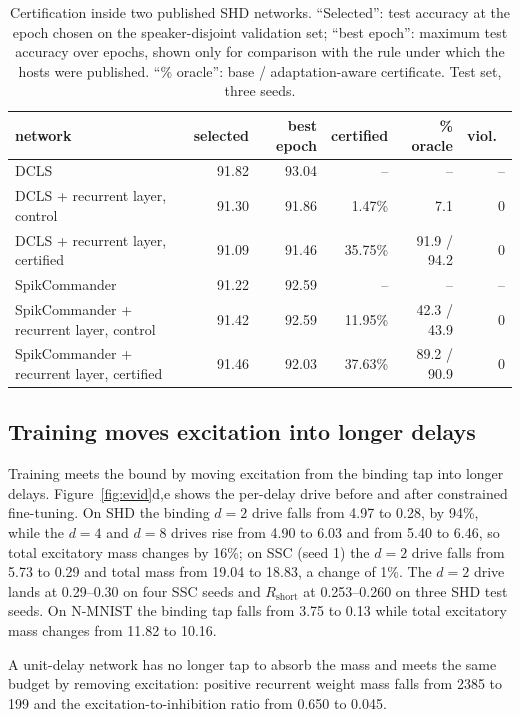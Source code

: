 \documentclass{iopjournal}
\begin{document}
\begin{table}
\caption{\label{tab:sota}Certification inside two published SHD networks. ``Selected'': test accuracy at the epoch chosen on the speaker-disjoint validation set; ``best epoch'': maximum test accuracy over epochs, shown only for comparison with the rule under which the hosts were published. ``\% oracle'': base / adaptation-aware certificate. Test set, three seeds.}
\centering
\begin{tabular}{lrrrrr}
\hline
network & selected & best epoch & certified & \% oracle & viol.\ \\
\hline
DCLS \cite{dcls}                           & 91.82 & 93.04 & --      & --          & -- \\
DCLS + recurrent layer, control            & 91.30 & 91.86 & 1.47\%  & 7.1         & 0 \\
DCLS + recurrent layer, certified          & 91.09 & 91.46 & 35.75\% & 91.9 / 94.2 & 0 \\
\hline
SpikCommander \cite{spikcommander}         & 91.22 & 92.59 & --      & --          & -- \\
SpikCommander + recurrent layer, control   & 91.42 & 92.59 & 11.95\% & 42.3 / 43.9 & 0 \\
SpikCommander + recurrent layer, certified & 91.46 & 92.03 & 37.63\% & 89.2 / 90.9 & 0 \\
\hline
\end{tabular}
\end{table}

\subsection{Training moves excitation into longer delays}
\label{sec:mechanism}

Training meets the bound by moving excitation from the binding tap into longer delays. Figure~\ref{fig:evid}d,e shows the per-delay drive before and after constrained fine-tuning. On SHD the binding $d=2$ drive falls from 4.97 to 0.28, by 94\%, while the $d=4$ and $d=8$ drives rise from 4.90 to 6.03 and from 5.40 to 6.46, so total excitatory mass changes by 16\%; on SSC (seed 1) the $d=2$ drive falls from 5.73 to 0.29 and total mass from 19.04 to 18.83, a change of 1\%. The $d=2$ drive lands at 0.29--0.30 on four SSC seeds and $R_{\mathrm{short}}$ at 0.253--0.260 on three SHD test seeds. On N-MNIST the binding tap falls from 3.75 to 0.13 while total excitatory mass changes from 11.82 to 10.16.

A unit-delay network has no longer tap to absorb the mass and meets the same budget by removing excitation: positive recurrent weight mass falls from 2385 to 199 and the excitation-to-inhibition ratio from 0.650 to 0.045.
\end{document}
